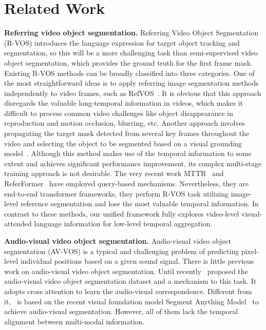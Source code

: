 \documentclass{article}
\begin{document}
\section{Related Work}
\textbf{Referring video object segmentation.} Referring Video Object Segmentation (R-VOS) introduces the language expression for target object tracking and segmentation, so this will be a more challenging task than semi-supervised video object segmentation, which provides the ground truth for the first frame mask. Existing R-VOS methods can be broadly classified into three categories. One of the most straightforward ideas is to apply referring image segmentation methods~\cite{ding2021vision, feng2021encoder, hu2016segmentation, yang2022lavt, wang2022cris} independently to video frames, such as RefVOS~\cite{bellver2020refvos}. It is obvious that this approach disregards the valuable long-temporal information in videos, which makes it difficult to process common video challenges like object disappearance in reproduction and motion occlusion, blurring, etc.
Another approach involves propagating the target mask detected from several key frames throughout the video and selecting the object to be segmented based on a visual grounding model~\cite{kamath2021mdetr,luo2020multi,yu2018mattnet,zhang2017discriminative}. Although this method makes use of the temporal information to some extent and achieves significant performance improvement, its complex multi-stage training approach is not desirable. The very recent work MTTR~\cite{botach2022end} and ReferFormer~\cite{wu2022language} have employed query-based mechanisms. Nevertheless, they are end-to-end transformer frameworks, they perform R-VOS task utilizing image-level reference segmentation and lose the most valuable temporal information. In contrast to these methods, our unified framework fully explores video-level visual-attended language information for low-level temporal aggregation.

\textbf{Audio-visual video object segmentation.}  Audio-visual video object segmentation (AV-VOS) is a typical and challenging problem of predicting pixel-level individual positions based on a given sound signal. There is little previous work on audio-visual video object segmentation. Until recently~\cite{zhou2022audio} proposed the audio-visual video object segmentation dataset and a mechanism to this task. It adopts cross attention to learn the audio-visual correspondence. Different from it,~\cite{mo2023av} is based on the recent visual foundation model Segment Anything Model~\cite{kirillov2023segment,zhang2023personalize} to achieve audio-visual segmentation. However, all of them lack the temporal alignment between multi-modal information.
\end{document}
